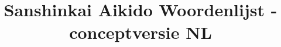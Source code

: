 \documentclass{memoir}
\begin{document}
\title{Sanshinkai Aikido Woordenlijst - conceptversie NL}
\maketitle


\end{document}
